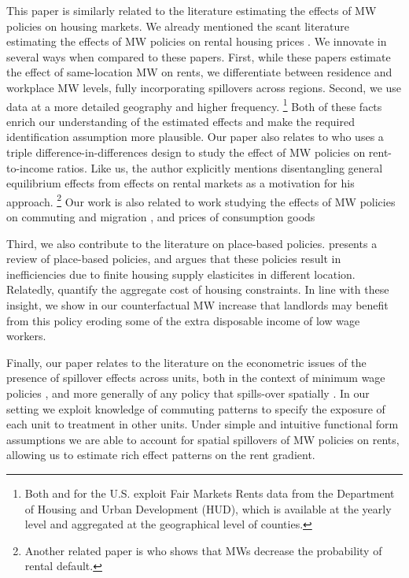 This paper is similarly related to the literature estimating the effects of MW 
policies on housing markets.
We already mentioned the scant literature estimating the effects of MW policies
on rental housing prices \parencite{Tidemann2018, Yamagishi2021}.
We innovate in several ways when compared to these papers.
First, while these papers estimate the effect of same-location MW on rents, we 
differentiate between residence and workplace MW levels, fully incorporating
spillovers across regions.
Second, we use data at a more detailed geography and higher frequency.%
\footnote{Both \textcite{Tidemann2018} and \textcite{Yamagishi2019} for the U.S. 
exploit Fair Markets Rents data from the Department of Housing and Urban 
Development (HUD), which is available at the yearly level and aggregated at the
geographical level of counties.}
Both of these facts enrich our understanding of the estimated effects and make 
the required identification assumption more plausible.
Our paper also relates to \textcite{Hughes2020} who uses a triple 
difference-in-differences design to study the effect of MW policies 
on rent-to-income ratios. Like us, the author explicitly mentions 
disentangling general equilibrium effects from effects on rental markets as 
a motivation for his approach. 
\footnote{Another related paper is \textcite{AgarwalEtAl2019} who shows that MWs
decrease the probability of rental default.}
Our work is also related to work studying the effects of MW policies on commuting
and migration \parencite{Cadena2014,Monras2019,PerezPerez2021}, and prices of 
consumption goods \parencite{AllegrettoReich2018,Leung2021}

Third, we also contribute to the literature on place-based policies.
\parencite{KlineMoretti2014} presents a review of place-based policies, and argues
that these policies result in inefficiencies due to finite housing supply elasticites
in different location.
Relatedly, \textcite{HsiehMoretti2019} quantify the aggregate cost of housing constraints.
In line with these insight, we show in our counterfactual MW increase that landlords may 
benefit from this policy eroding some of the extra disposable income of low wage workers. 



Finally, our paper relates to the literature on the econometric issues of the 
presence of spillover effects across units,
both in the context of minimum wage policies \parencite{Kuehn2016, Huang2020}, and
more generally of any policy that spills-over spatially
\parencite{DelgadoFlorax2015, Butts2021}. 
In our setting we exploit knowledge of commuting patterns to specify the exposure
of each unit to treatment in other units.
Under simple and intuitive functional form assumptions we are able to account for 
spatial spillovers of MW policies on rents, allowing us
to estimate rich effect patterns on the rent gradient. 

